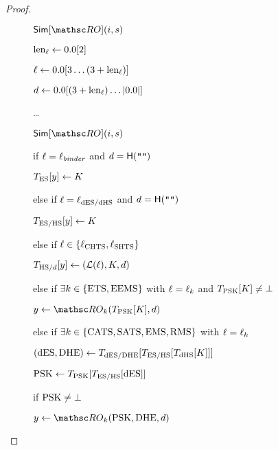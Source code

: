 \begin{proof}
\begin{figure}[tp]
\begin{minipage}[t]{0.45\textwidth}
\begin{oracle}{$\Sim[\RO](\simIndex,\simInString)$}
				\item[]  
				\item $\kdflbllen \gets \hmactext[2]$
				\item $\kdflbl \gets \hmactext[3\ldots (3+\kdflbllen)]$
				\item $\hashcontext \gets \hmactext[(3+\kdflbllen)\ldots|\hmactext|]$
				\item[] \ldots {}
			\end{oracle}
			
			
		\end{minipage}
		\begin{minipage}[t]{0.54\textwidth}
			\ExptSepSpace
			\begin{oracle}{$\Sim[\RO](\simIndex,\simInString)$}
				\item if $\ell = \ell_{\mathit{binder}}$ and $d = \mathsf{H}(\texttt{""})$
				\item \quad  $T_{\mathrm{ES}}[y] \gets K$
				
				\item else if $\ell = \ell_{\mathrm{dES}/\mathrm{dHS}}$ and $d = \mathsf{H}(\texttt{""})$
				\item \quad $T_{\mathrm{ES}/\mathrm{HS}}[y] \gets K$
				
				\item  else if $\ell \in \{\ell_{\mathrm{CHTS}}, \ell_{\mathrm{SHTS}}\}$
				\item \quad $T_{\mathrm{HS}/d}[y] \gets (\mathcal{L}(\ell), K, d)$
				
				\item else if $\exists k \in \{\mathrm{ETS}, \mathrm{EEMS}\}$ with  $\ell  = \ell_k$ and $T_{\mathrm{PSK}}[K] \neq \bot$
				\item \quad $\simOut \gets \RO_{k}(\rlookuptable_{\psk}[\hmackey],\hashcontext)$
				
				\item else if $\exists k \in \{\mathrm{CATS}, \mathrm{SATS}, \mathrm{EMS}, \mathrm{RMS}\}$ with  $\ell  = \ell_k$
				\item \quad $(\mathrm{dES}, \mathrm{DHE}) \gets T_{\mathrm{dES}/\mathrm{DHE}}[T_{\mathrm{ES}/\mathrm{HS}} [ T_{\mathrm{dHS}}[K]]]$
				\item \quad $\mathrm{PSK} \gets T_{\mathrm{PSK}}[T_{\mathrm{ES}/\mathrm{HS}}[ \mathrm{dES}]]$
				\item \quad if $\mathrm{PSK}\neq \bot$
				\item \quad \quad  $\simOut \gets \RO_{k}(\psk, \dhe, \hashcontext)$ 
				

\end{oracle}
\end{minipage}
\end{figure}
\end{proof}
